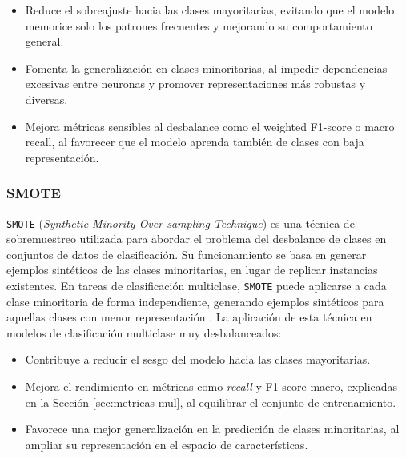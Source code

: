 \begin{itemize}
	\item Reduce el sobreajuste hacia las clases mayoritarias, evitando que el modelo memorice solo los patrones frecuentes y mejorando su comportamiento general.

	\item Fomenta la generalización en clases minoritarias, al impedir dependencias excesivas entre neuronas y promover representaciones más robustas y diversas.

	\item Mejora métricas sensibles al desbalance como el weighted F1-score o macro recall, al favorecer que el modelo aprenda también de clases con baja representación.
\end{itemize}


\subsubsection{SMOTE}
\texttt{SMOTE} (\textit{Synthetic Minority Over-sampling Technique}) es una técnica de sobremuestreo utilizada para abordar el problema del desbalance de clases en conjuntos de datos de clasificación. Su funcionamiento se basa en generar ejemplos sintéticos de las clases minoritarias, en lugar de replicar instancias existentes. En tareas de clasificación multiclase, \texttt{SMOTE} puede aplicarse a cada clase minoritaria de forma independiente, generando ejemplos sintéticos para aquellas clases con menor representación \cite{chawla2002smote}. La aplicación de esta técnica en modelos de clasificación multiclase muy desbalanceados:

\begin{itemize}
	\item Contribuye a reducir el sesgo del modelo hacia las clases mayoritarias.

	\item Mejora el rendimiento en métricas como \textit{recall} y F1-score macro, explicadas en la Sección \ref{sec:metricas-mul}, al equilibrar el conjunto de entrenamiento. 

	\item Favorece una mejor generalización en la predicción de clases minoritarias, al ampliar su representación en el espacio de características.
\end{itemize}


